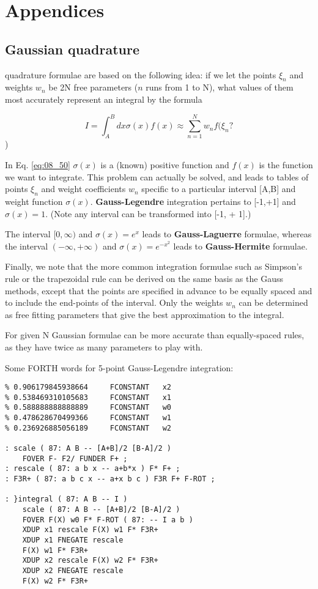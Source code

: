 \section{Appendices}

\subsection{Gaussian quadrature}

 quadrature formulae are based on the following idea: if we let the points $\xi_{n}$ and weights $w_{n}$ be 2N free parameters ($n$ runs from 1 to N), what values of them most accurately represent an integral by the formula

\begin{equation}\label{eq:08_50}
I = \int_{A}^{B} dx \sigma(x)f(x) \approx \sum_{n=1}^{N} w_{n}f(\xi_{n} ?
\end{equation})

In Eq. \ref{eq:08_50} $\sigma(x)$ is a (known) positive function and $f(x)$ is the function we want to integrate. This problem can actually be solved, and leads to tables of points $\xi_n$ and weight coefficients $w_{n}$ specific to a particular interval [A,B] and weight function $\sigma(x)$. \textbf{Gauss-Legendre} integration pertains to [-1,+1] and $\sigma(x) = 1$. (Note any interval can be transformed into [-1, + 1].)

The interval $[0, \infty)$ and $\sigma(x) = e^{x}$ leads to \textbf{Gauss-Laguerre} formulae, whereas the interval $(-\infty, +\infty)$ and $\sigma(x) = e^{-x^{2}}$ leads to \textbf{Gauss-Hermite} formulae.

Finally, we note that the more common integration formulae such as Simpson’s rule or the trapezoidal rule can be derived on the same basis as the Gauss methods, except that the points are specified in advance to be equally spaced and to include the end-points of the interval. Only the weights $w_{n}$ can be determined as free fitting parameters that give the best approximation to the integral.

For given N Gaussian formulae can be more accurate than equally-spaced rules, as they have twice as many parameters to play with.

Some FORTH words for 5-point Gauss-Legendre integration:

\begin{lstlisting}
% 0.906179845938664     FCONSTANT   x2
% 0.538469310105683     FCONSTANT   x1
% 0.588888888888889     FCONSTANT   w0
% 0.478628670499366     FCONSTANT   w1
% 0.236926885056189     FCONSTANT   w2

: scale ( 87: A B -- [A+B]/2 [B-A]/2 )
    FOVER F- F2/ FUNDER F+ ;
: rescale ( 87: a b x -- a+b*x ) F* F+ ;
: F3R+ ( 87: a b c x -- a+x b c ) F3R F+ F-ROT ;

: }integral ( 87: A B -- I )
    scale ( 87: A B -- [A+B]/2 [B-A]/2 )
    FOVER F(X) w0 F* F-ROT ( 87: -- I a b )
    XDUP x1 rescale F(X) w1 F* F3R+
    XDUP x1 FNEGATE rescale
    F(X) w1 F* F3R+
    XDUP x2 rescale F(X) w2 F* F3R+
    XDUP x2 FNEGATE rescale
    F(X) w2 F* F3R+
\end{lstlisting}

